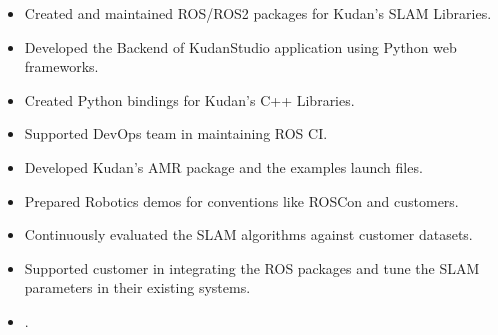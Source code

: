 \documentclass[10pt,a4paper,ragged2e]{altacv}
\begin{document}

\begin{fullwidth}
\makecvheader
\end{fullwidth}



\begin{itemize}
\item Created and maintained ROS/ROS2 packages for Kudan's SLAM Libraries.
\item Developed the Backend of KudanStudio application using Python web frameworks.
\item Created Python bindings for Kudan's C++ Libraries. 
\item Supported DevOps team in maintaining ROS CI.
\item Developed Kudan's AMR package and the examples launch files.
\item Prepared Robotics demos for conventions like ROSCon and customers. 
\item Continuously evaluated the SLAM algorithms against customer datasets.
\item Supported customer in integrating the ROS packages and tune the SLAM parameters in their existing systems.
\item {}.
\end{itemize}
\end{document}
